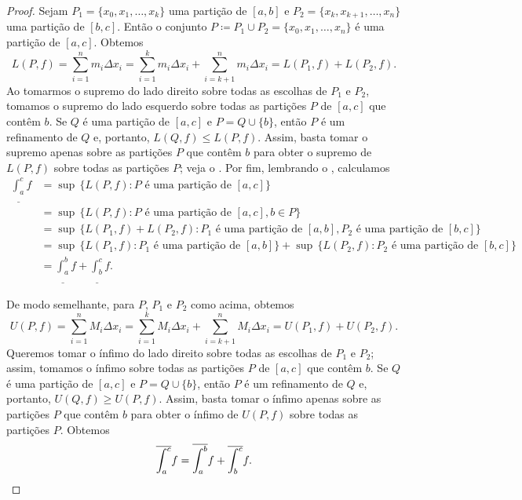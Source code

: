 \begin{proof}
Sejam $P_1 = \{ x_0,x_1,\ldots,x_k \}$
uma partição de $[a,b]$ e $P_2 = \{ x_k, x_{k+1}, \ldots, x_n \}$ uma partição
de $[b,c]$.
Então o conjunto $P \coloneqq P_1 \cup P_2 = \{ x_0, x_1, \ldots, x_n \}$ é
uma partição de $[a,c]$. Obtemos
\begin{equation*}
L(P,f) =
\sum_{i=1}^n m_i \Delta x_i
=
\sum_{i=1}^k m_i \Delta x_i
+
\sum_{i=k+1}^n m_i \Delta x_i
=
L(P_1,f) + L(P_2,f) .
\end{equation*}
Ao tomarmos o supremo do lado direito sobre todas as escolhas de $P_1$ e $P_2$,
tomamos o supremo do lado esquerdo sobre todas as partições $P$ de $[a,c]$
que contêm $b$. Se $Q$ é uma partição de $[a,c]$ e $P = Q \cup \{ b \}$,
então $P$ é um refinamento de $Q$ e, portanto, $L(Q,f) \leq L(P,f)$.
Assim, basta tomar o supremo apenas sobre as partições $P$ que contêm $b$
para obter o supremo de $L(P,f)$ sobre todas as partições $P$; veja o
.
Por fim, lembrando o ,
calculamos
\begin{equation*}
\begin{split}
\underline{\int_a^c} f
& =
\sup \, \bigl\{ L(P,f) : P \text{ é uma partição de } [a,c] \bigr\}
\\
& =
\sup \, \bigl\{ L(P,f) : P \text{ é uma partição de } [a,c], b \in P \bigr\}
\\
& =
\sup \, \bigl\{ L(P_1,f) + L(P_2,f) :
P_1 \text{ é uma partição de } [a,b], P_2 \text{ é uma partição de } [b,c] \bigr\}
\\
& =
\sup \, \bigl\{ L(P_1,f) : P_1 \text{ é uma partição de } [a,b] \bigr\}
+
\sup \, \bigl\{ L(P_2,f) : P_2 \text{ é uma partição de } [b,c] \bigr\}
\\
&=
\underline{\int_a^b} f + \underline{\int_b^c} f .
\end{split}
\end{equation*}

De modo semelhante, para $P$, $P_1$ e $P_2$ como acima, obtemos
\begin{equation*}
U(P,f) =
\sum_{i=1}^n M_i \Delta x_i
=
\sum_{i=1}^k M_i \Delta x_i
+
\sum_{i=k+1}^n M_i \Delta x_i
=
U(P_1,f) + U(P_2,f) .
\end{equation*}
Queremos tomar o ínfimo do lado direito
sobre todas as escolhas de $P_1$ e $P_2$; assim, tomamos o ínfimo
sobre todas as partições $P$ de $[a,c]$ que contêm $b$. Se $Q$ é uma partição
de $[a,c]$ e $P = Q \cup \{ b \}$, então $P$ é um refinamento de $Q$
e, portanto, $U(Q,f) \geq U(P,f)$. Assim, basta tomar o ínfimo apenas sobre
as partições $P$ que contêm $b$ para obter o ínfimo de $U(P,f)$ sobre
todas as partições $P$.
Obtemos
\begin{equation*}
\overline{\int_a^c} f
=
\overline{\int_a^b} f + \overline{\int_b^c} f .  \qedhere
\end{equation*}
\end{proof}

